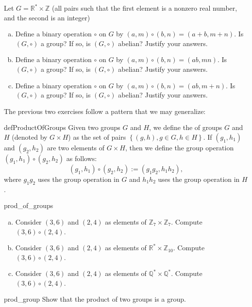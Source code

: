 \begin{exercise}{19}
Let $G = {\mathbb R}^{\ast} \times {\mathbb Z}$ (all pairs such that the first element is a nonzero real number, and the second is an integer) 
\begin{enumerate}[(a)]
\item
Define a binary operation $\circ$ on $G$ by $(a,m) \circ (b,n) = (a+b, m+n)$.  Is $(G , \circ)$ a group?  If so, is $(G , \circ)$ abelian?  Justify your answers.
\item
Define a binary operation $\circ$ on $G$ by $(a,m) \circ (b,n) = (ab, mn)$.  Is $(G , \circ)$ a group?  If so, is $(G , \circ)$ abelian?  Justify your answers.
\item
Define a binary operation $\circ$ on $G$ by $(a,m) \circ (b,n) = (ab, m+n)$.  Is $(G , \circ)$ a group?  If so, is $(G , \circ)$ abelian?  Justify your answers.
\end{enumerate}
\end{exercise}
The previous two exercises follow a pattern that we may generalize:

\begin{defn}{defProductOfGroups}
Given two groups $G$ and $H$, we define the  of groups $G$ and $H$ (denoted by $G \times H$) as the set of pairs $\left\{(g,h), g \in G, h \in H \right\}$. If $(g_1, h_1)$ and $(g_2,h_2)$ are two elements of $G \times H$, then we define the group operation  $(g_1, h_1) \circ (g_2, h_2)$ as follows: 
\[ (g_1, h_1) \circ (g_2, h_2) := (g_1g_2, h_1h_2),\]
where $g_1g_2$ uses the group operation in $G$ and $h_1h_2$ uses the group operation in $H$.
\end{defn}

\begin{exercise}{prod_of_groups}
\begin{enumerate}[(a)]
\item
Consider $(3,6)$ and $(2,4)$ as elements of ${\mathbb Z}_7 \times {\mathbb Z}_7$. Compute 
$(3,6) \circ (2,4)$.
\item
Consider $(3,6)$ and $(2,4)$ as elements of ${\mathbb R}^{\ast} \times {\mathbb Z}_{10}$. Compute 
$(3,6) \circ (2,4)$.
\item
Consider $(3,6)$ and $(2,4)$ as elements of ${\mathbb Q}^{\ast} \times {\mathbb Q}^{\ast}$. Compute 
$(3,6) \circ (2,4)$.
\end{enumerate}
\end{exercise}

\begin{exercise}{prod_group}
Show that the product of two groups is a group.
\end{exercise}



